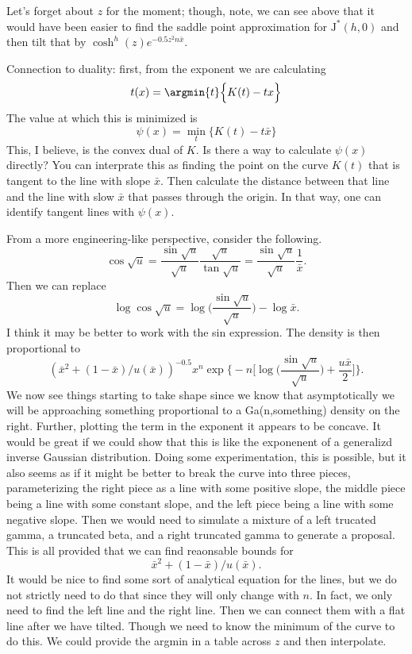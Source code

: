 \documentclass[12pt]{article}
\newcommand{\JJ}{\mbox{J}^*}
\begin{document}
Let's forget about $z$ for the moment; though, note, we can see above that it
would have been easier to find the saddle point approximation for $\JJ(h,0)$ and
then tilt that by $\cosh^{h}(z) e^{-0.5 z^2 n \bar x}$.

Connection to duality: first, from the exponent we are calculating
\[
t(x) = \argmin{t} \Big\{ K(t) - tx \Big\}
\]
The value at which this is minimized is
\[
\psi(x) = \min_t \Big\{ K(t) - t \bar x \Big\}
\]
This, I believe, is the convex dual of $K$.  Is there a way to calculate
$\psi(x)$ directly?  You can interprate this as finding the point on the curve
$K(t)$ that is tangent to the line with slope $\bar x$.  Then calculate the
distance between that line and the line with slow $\bar x$ that passes through
the origin.  In that way, one can identify tangent lines with $\psi(x)$.

From a more engineering-like perspective, consider the following.
\[
\cos \sqrt{u} = \frac{\sin \sqrt{u}}{\sqrt{u}} \frac{\sqrt{u}}{\tan \sqrt{u}} = 
 \frac{\sin \sqrt{u}}{\sqrt{u}} \frac{1}{\bar x}.
\]
Then we can replace 
\[
\log \cos \sqrt{u} = \log \Big( \frac{\sin{\sqrt{u}}}{\sqrt{u}} \Big) - \log \bar x.
\]
I think it may be better to work with the sin expression.  The density is then
proportional to
\[
(\bar x^2 + (1-\bar x) / u(\bar x))^{-0.5} x^n 
\exp \Big\{ -n \Big[\log \Big( \frac{\sin{\sqrt{u}}}{\sqrt{u}} \Big) + \frac{u
\bar x}{2} \Big] \Big\}.
\]
We now see things starting to take shape since we know that asymptotically we
will be approaching something proportional to a Ga(n,something) density on the
right.  Further, plotting the term in the exponent it appears to be concave.  It
would be great if we could show that this is like the exponenent of a generalizd
inverse Gaussian distribution.  Doing some experimentation, this is possible,
but it also seems as if it might be better to break the curve into three pieces,
parameterizing the right piece as a line with some positive slope, the middle
piece being a line with some constant slope, and the left piece being a line
with some negative slope.  Then we would need to simulate a mixture of a left
trucated gamma, a truncated beta, and a right truncated gamma to generate a
proposal.  This is all provided that we can find reaonsable bounds for
\[
\bar x^2 + (1-\bar x) / u(\bar x).
\]
It would be nice to find some sort of analytical equation for the lines, but we
do not strictly need to do that since they will only change with $n$.  In fact,
we only need to find the left line and the right line.  Then we can connect them
with a flat line after we have tilted.  Though we need to know the minimum of
the curve to do this.  We could provide the argmin in a table across $z$ and
then interpolate.
\end{document}
